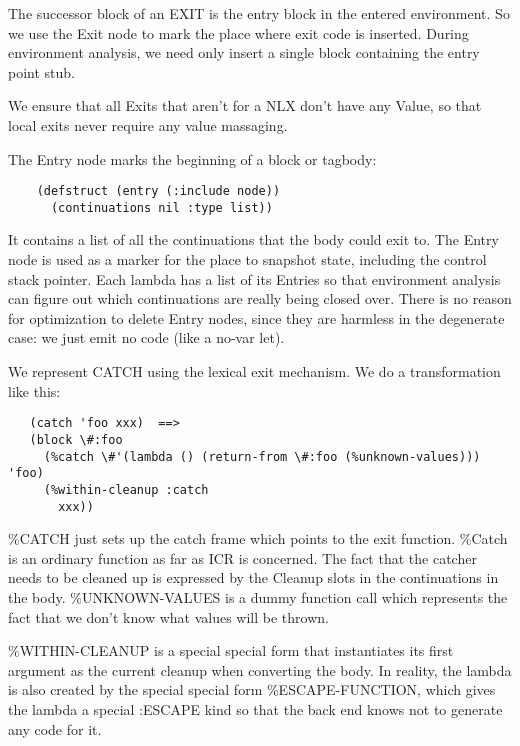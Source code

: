 The successor block of an EXIT is the entry block in the entered environment.
So we use the Exit node to mark the place where exit code is inserted.  During
environment analysis, we need only insert a single block containing the entry
point stub.

We ensure that all Exits that aren't for a NLX don't have any Value, so that
local exits never require any value massaging.

The Entry node marks the beginning of a block or tagbody:
\begin{verbatim} 
    (defstruct (entry (:include node))
      (continuations nil :type list)) 
\end{verbatim}
It contains a list of all the continuations that the body could exit to.  The
Entry node is used as a marker for the place to snapshot state, including
the control stack pointer.  Each lambda has a list of its Entries so
that environment analysis can figure out which continuations are really being
closed over.  There is no reason for optimization to delete Entry nodes,
since they are harmless in the degenerate case: we just emit no code (like a
no-var let).


We represent CATCH using the lexical exit mechanism.  We do a transformation
like this:
\begin{verbatim}
   (catch 'foo xxx)  ==>
   (block \#:foo
     (%catch \#'(lambda () (return-from \#:foo (%unknown-values))) 'foo)
     (%within-cleanup :catch
       xxx))
\end{verbatim}

\%CATCH just sets up the catch frame which points to the exit function.  \%Catch
is an ordinary function as far as ICR is concerned.  The fact that the catcher
needs to be cleaned up is expressed by the Cleanup slots in the continuations
in the body.  \%UNKNOWN-VALUES is a dummy function call which represents the
fact that we don't know what values will be thrown.  

\%WITHIN-CLEANUP is a special special form that instantiates its first argument
as the current cleanup when converting the body.  In reality, the lambda is
also created by the special special form \%ESCAPE-FUNCTION, which gives the
lambda a special :ESCAPE kind so that the back end knows not to generate any
code for it.


